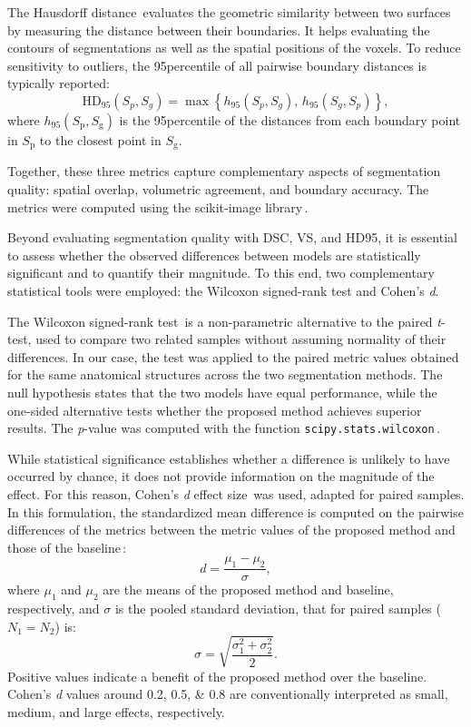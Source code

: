The Hausdorff distance\,\cite{Hausdorff1991, FeTA2021_review} evaluates the geometric similarity between two surfaces by measuring the distance between their boundaries. It helps evaluating the contours of segmentations as well as the spatial positions of the voxels. To reduce sensitivity to outliers, the 95\th percentile of all pairwise boundary distances is typically reported:
\begin{equation}
    \text{HD}_{95}(S_p, S_g) = \max \left\{ h_{95}(S_p, S_g), \, h_{95}(S_g, S_p) \right\},
\end{equation}
where $h_{95}(S_\text{p}, S_\text{g})$ is the 95\th percentile of the distances from each boundary point in $S_\text{p}$ to the closest point in $S_\text{g}$.

Together, these three metrics capture complementary aspects of segmentation quality: spatial overlap, volumetric agreement, and boundary accuracy. The metrics were computed using the scikit-image library\,\cite{Walt2014, scikit-image}.

Beyond evaluating segmentation quality with DSC, VS, and HD95, it is essential to assess whether the observed differences between models are statistically significant and to quantify their magnitude. To this end, two complementary statistical tools were employed: the Wilcoxon signed-rank test and Cohen's \textit{d}.

The Wilcoxon signed-rank test\,\cite{Wilcoxon1945} is a non-parametric alternative to the paired \textit{t}-test, used to compare two related samples without assuming normality of their differences. In our case, the test was applied to the paired metric values obtained for the same anatomical structures across the two segmentation methods. The null hypothesis states that the two models have equal performance, while the one-sided alternative tests whether the proposed method achieves superior results. The \textit{p}-value was computed with the function \verb|scipy.stats.wilcoxon|\,\cite{SciPy}.

While statistical significance establishes whether a difference is unlikely to have occurred by chance, it does not provide information on the magnitude of the effect. For this reason, Cohen's \textit{d} effect size\,\cite{Cohen2013} was used, adapted for paired samples. In this formulation, the standardized mean difference is computed on the pairwise differences of the metrics between the metric values of the proposed method and those of the baseline\,\cite{effect_size}:
\begin{equation}
    d = \frac{\mu_1-\mu_2}{\sigma},
\end{equation}
where $\mu_1$ and $\mu_2$ are the means of the proposed method and baseline, respectively, and $\sigma$ is the pooled standard deviation, that for paired samples ($N_1 = N_2$) is:
\begin{equation}
    \sigma = \sqrt{\frac{\sigma_1^2+\sigma_2^2}{2}}.
\end{equation}
Positive values indicate a benefit of the proposed method over the baseline. Cohen's \textit{d} values around \numlist{0.2; 0.5; 0.8} are conventionally interpreted as small, medium, and large effects, respectively.

